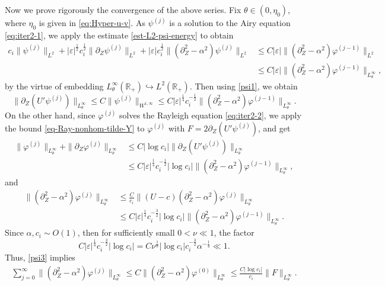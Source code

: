 \documentclass[reqno,11pt]{amsart}
\numberwithin{equation}{section}
\numberwithin{equation}{section}
\theoremstyle{plain}
\begin{document}
Now we prove rigorously the convergence of the above series. Fix $\theta\in (0,\eta_0)$, where $\eta_0$ is given in \eqref{eq:Hyper-u-v}. As $\psi^{(j)}$ is a solution to the Airy equation \eqref{eq:iter2-1}, we apply the estimate \eqref{est-L2-psi-energy} to obtain 
\begin{align}\label{psi1}
	c_i\|\psi^{(j)}\|_{L^2}+|\varepsilon|^{\frac12}c_i^{\frac12}\|\partial_Z\psi^{(j)}\|_{L^2}+|\varepsilon|c_i^{\frac12}\|(\partial_Z^2-\alpha^2)\psi^{(j)}\|_{L^2}&\leq C|\varepsilon|\|(\partial_Z^2-\alpha^2)\varphi^{(j-1)}\|_{L^2}\nonumber\\
	&\leq C|\varepsilon|\|(\partial_Z^2-\alpha^2)\varphi^{(j-1)}\|_{L^\infty_{\theta}},
\end{align}
by the virtue of embedding $L^\infty_{\theta}(\mathbb{R}_+)\hookrightarrow L^2(\mathbb{R}_+)$. Then using \eqref{psi1},  we obtain
$$\|\partial_Z(U'\psi^{(j)})\|_{L^\infty_{\theta}}\leq C\|\psi^{(j)}\|_{W^{1,\infty}}\leq C|\varepsilon|^{\frac14}c_i^{-\frac12}
\|(\partial_Z^2-\alpha^2)\varphi^{(j-1)}\|_{L^\infty_{\theta}}.$$
On the other hand, since $\varphi^{(j)}$ solves the Rayleigh equation \eqref{eq:iter2-2}, we apply the bound \eqref{eq-Ray-nonhom-tilde-Y} to $\varphi^{(j)}$ with $F=2\partial_Z(U'\psi^{(j)})$, and get
\begin{align}
	\|\varphi^{(j)}\|_{L^\infty_{\theta}}+\|\partial_Z\varphi^{(j)}\|_{L^\infty_{\theta}}&\leq C|\log c_i|\|\partial_Z(U'\psi^{(j)})\|_{L^\infty_{\theta}}\nonumber\\
	&\leq C|\varepsilon|^{\frac14}c_i^{-\frac12}|\log c_i|\|(\partial_Z^2-\alpha^2)\varphi^{(j-1)}\|_{L^\infty_{\theta}},\label{psi2}
\end{align}
and
\begin{align}	
	\|(\partial_Z^2-\alpha^2)\varphi^{(j)}\|_{L^\infty_{\theta}}&\leq \frac{C}{c_i}\|(U-c)(\partial_Z^2-\alpha^2)\varphi^{(j)}\|_{L^\infty_{\theta}}\nonumber\\
	&\leq C|\varepsilon|^{\frac14}c_i^{-\frac32}|\log c_i| \|(\partial_Z^2-\alpha^2)\varphi^{(j-1)}\|_{L^\infty_{\theta}}\label{psi3}.
\end{align}
Since $\alpha, c_i\sim O(1)$, then for sufficiently small $0<\nu\ll 1$, the factor
$$
 C|\varepsilon|^{\frac14} c_i^{-\frac32}|\log c_i|=C\nu^{\frac18}|\log c_i|c_i^{-\frac32}\alpha^{-\frac14}\ll 1.
$$
Thus, \eqref{psi3} implies
\begin{align}
	\sum_{j=0}^\infty \|(\partial_Z^2-\alpha^2)\varphi^{(j)}\|_{L^\infty_{\theta}}\leq C\|(\partial_Z^2-\alpha^2)\varphi^{(0)}\|_{L^\infty_{\theta}}\leq \frac{C|\log c_i|}{c_i}\|F\|_{L^\infty_{\theta}}.\label{psi4}
\end{align}
\end{document}

